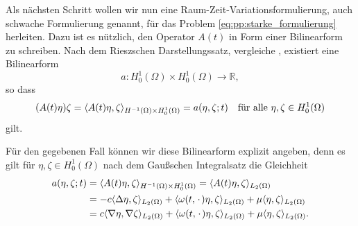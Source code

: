Als nächsten Schritt wollen wir nun eine Raum-Zeit-Variationsformulierung, auch schwache Formulierung genannt, für das Problem  \cref{eq:pp:starke_formulierung} herleiten.
Dazu ist es nützlich, den Operator $A(t)$ in Form einer Bilinearform zu schreiben.
Nach dem Rieszschen Darstellungssatz, vergleiche \cite[Theorem \S{}22.1]{Halmos:1957vd}, existiert eine Bilinearform
\begin{equation}
    a \colon H^{1}_{0}(\Omega) \times H^{1}_{0}(\Omega) \to \mathbb{R},
\end{equation}
so dass
\begin{equation}
    (A(t)\eta)\zeta = \skp{A(t)\eta}{\zeta}{H^{-1}(\Omega) \times H^{1}_{0}(\Omega)} = a(\eta, \zeta; t) \quad \fa \eta, \zeta \in H^{1}_{0}(\Omega)
\end{equation}
gilt.


Für den gegebenen Fall können wir diese Bilinearform explizit angeben, denn es gilt für $\eta, \zeta \in H^{1}_{0}(\Omega)$ nach dem Gaußschen Integralsatz die Gleichheit
\begin{equation}
    \begin{aligned}
        a(\eta, \zeta; t)
        &=    \skp{A(t)\eta}{\zeta}{H^{-1}(\Omega) \times H^{1}_{0}(\Omega)}
        =  \skp{A(t)\eta}{\zeta}{L_{2}(\Omega)}
        \\&= - c \skp{\Delta \eta}{\zeta}{L_{2}(\Omega)}
                + \skp{\omega(t, \blank) \eta}{\zeta}{L_{2}(\Omega)}
                + \mu \skp{\eta}{\zeta}{L_{2}(\Omega)}
        \\&= c \skp{\grad \eta}{\grad \zeta}{L_{2}(\Omega)}
                + \skp{\omega(t, \blank) \eta}{\zeta}{L_{2}(\Omega)}
                + \mu \skp{\eta}{\zeta}{L_{2}(\Omega)}.
    \end{aligned}
\end{equation}


